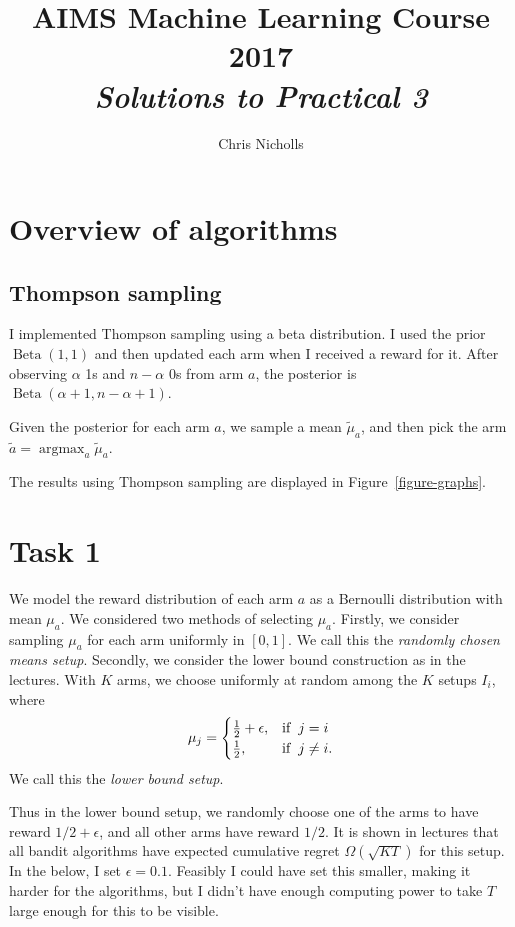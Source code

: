 \documentclass[10pt]{article}
\title{AIMS Machine Learning Course 2017 \\ \emph{Solutions to Practical 3}}
\author{Chris Nicholls}
\DeclareMathOperator{\Beta}{Beta}
\DeclareMathOperator{\argmax}{argmax}
\begin{document}
\maketitle

\section{Overview of algorithms}

\subsection{Thompson sampling}
I implemented Thompson sampling using a beta distribution. I used the prior
$\Beta(1,1)$ and then updated each arm when I received a reward for it. After
observing $\alpha$ 1s and $n - \alpha$ 0s from arm $a$, the posterior is
$\Beta(\alpha + 1, n - \alpha + 1)$.

Given the posterior for each arm $a$, we sample a mean $\tilde{\mu}_a$, and then pick
the arm $\tilde{a} = \argmax_a \tilde{\mu}_a$.

The results using Thompson sampling are displayed in Figure~\ref{figure-graphs}.

\section{Task 1}

We model the reward distribution of each arm $a$ as a Bernoulli distribution
with mean $\mu_a$. We considered two methods of selecting $\mu_a$. Firstly, we
consider sampling $\mu_a$ for each arm uniformly in $[0,1]$. We call this the
\emph{randomly chosen means setup}. Secondly, we consider the lower bound
construction as in the lectures. With $K$ arms, we choose uniformly at random
among the $K$ setups $I_i$, where
\begin{align*}
    \mu_j =
    \begin{cases}
        \frac{1}{2} + \epsilon, & \textrm{if} \hspace{0.2cm} j = i \\
        \frac{1}{2}, & \textrm{if} \hspace{0.2cm} j \not= i.
    \end{cases}
\end{align*}
We call this the \emph{lower bound setup}.

Thus in the lower bound setup, we randomly choose one of the arms to have reward
$1/2 + \epsilon$, and all other arms have reward $1/2$. It is shown in lectures
that all bandit algorithms have expected cumulative regret $\Omega(\sqrt{K T})$
for this setup. In the below, I set $\epsilon = 0.1$. Feasibly I could have set
this smaller, making it harder for the algorithms, but I didn't have enough
computing power to take $T$ large enough for this to be visible.
\end{document}
